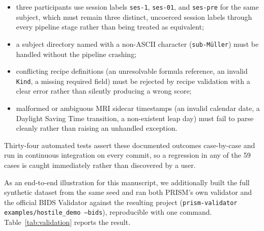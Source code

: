 \documentclass[10pt]{article}
\begin{document}
\begin{itemize}
  \item three participants use session labels \texttt{ses-1},
  \texttt{ses-01}, and \texttt{ses-pre} for the same subject, which must
  remain three distinct, uncoerced session labels through every pipeline
  stage rather than being treated as equivalent;
  \item a subject directory named with a non-ASCII character
  (\texttt{sub-M\"uller}) must be handled without the pipeline crashing;
  \item conflicting recipe definitions (an unresolvable formula reference, an
  invalid \texttt{Kind}, a missing required field) must be rejected by
  recipe validation with a clear error rather than silently producing a
  wrong score;
  \item malformed or ambiguous MRI sidecar timestamps (an invalid calendar
  date, a Daylight Saving Time transition, a non-existent leap day) must
  fail to parse cleanly rather than raising an unhandled exception.
\end{itemize}

Thirty-four automated tests assert these documented outcomes case-by-case
and run in continuous integration on every commit, so a regression in any of
the 59 cases is caught immediately rather than discovered by a user.

As an end-to-end illustration for this manuscript, we additionally built the
full synthetic dataset from the same seed and ran both PRISM's own validator
and the official BIDS Validator against the resulting project
(\texttt{prism-validator examples/hostile\_demo --bids}), reproducible with
one command. Table~\ref{tab:validation} reports the result.
\end{document}
